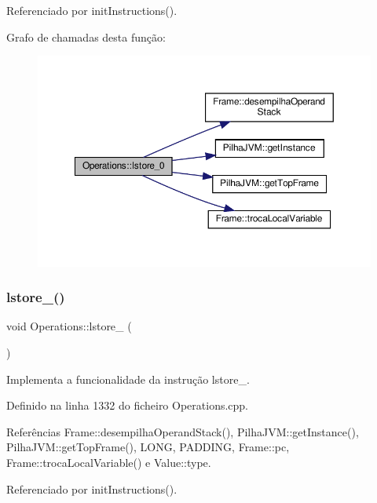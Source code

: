 Referenciado por init\+Instructions().

Grafo de chamadas desta função\+:\nopagebreak
\begin{figure}[H]
\begin{center}
\leavevmode
\includegraphics[width=350pt]{classOperations_ae3c949d56a3ee685668134493595334b_cgraph}
\end{center}
\end{figure}
\mbox{\label{classOperations_aa162cef00367e3d5fb5dca12494a5793}} 
\subsubsection{\texorpdfstring{lstore\+\_()}{lstore\_1()}}
{\footnotesize\ttfamily void Operations\+::lstore\+\_ (\begin{DoxyParamCaption}{ }\end{DoxyParamCaption})\hspace{0.3cm}{\ttfamily [private]}}



Implementa a funcionalidade da instrução lstore\+\_. 



Definido na linha 1332 do ficheiro Operations.\+cpp.



Referências Frame\+::desempilha\+Operand\+Stack(), Pilha\+J\+V\+M\+::get\+Instance(), Pilha\+J\+V\+M\+::get\+Top\+Frame(), L\+O\+NG, P\+A\+D\+D\+I\+NG, Frame\+::pc, Frame\+::troca\+Local\+Variable() e Value\+::type.



Referenciado por init\+Instructions().

